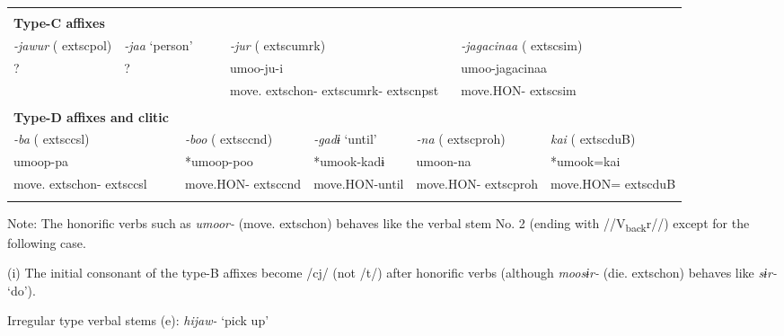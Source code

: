 \begin{tabularx}{\textwidth}{XXXXXXXXXXXXXXXXXXXX}
\multicolumn{3}{X}{} & \multicolumn{3}{X}{} & \multicolumn{5}{X}{} & \multicolumn{3}{X}{} & \multicolumn{2}{X}{} & \multicolumn{2}{X}{} & \multicolumn{2}{X}{}\\
\multicolumn{20}{X}{{\bfseries Type-C affixes}}\\
{ \textit{{}-jawur} (	extsc{pol})} & \multicolumn{4}{X}{{ \textit{{}-jaa} ‘person’}} & \multicolumn{6}{X}{{ \textit{{}-jur} (	extsc{umrk})}} & \multicolumn{9}{X}{{ \textit{{}-jagacinaa} (	extsc{sim})}}\\
{ ?} & \multicolumn{4}{X}{?} & \multicolumn{6}{X}{umoo-ju-i} & \multicolumn{9}{X}{{ umoo-jagacinaa}}\\
& \multicolumn{4}{X}{} & \multicolumn{6}{X}{move.	extsc{hon}-	extsc{umrk}-	extsc{npst}} & \multicolumn{9}{X}{move.HON-	extsc{sim}}\\
\multicolumn{20}{X}{}\\
\multicolumn{20}{X}{{\bfseries Type-D affixes and clitic}}\\
\multicolumn{4}{X}{{ \textit{{}-ba} (	extsc{csl})}} & \multicolumn{4}{X}{{ \textit{{}-boo} (	extsc{cnd})}} & \multicolumn{2}{X}{{ \textit{{}-gadɨ} ‘until’}} & \multicolumn{3}{X}{{ \textit{{}-na} (	extsc{proh})}} & \multicolumn{7}{X}{{ \textit{kai} (	extsc{du}B)}}\\
\multicolumn{4}{X}{{ umoop-pa}} & \multicolumn{4}{X}{{ *umoop-poo}} & \multicolumn{2}{X}{{ *umook-kadɨ}} & \multicolumn{3}{X}{{ umoon-na}} & \multicolumn{7}{X}{{ *umook=kai}}\\
\multicolumn{4}{X}{move.	extsc{hon}-	extsc{csl}} & \multicolumn{4}{X}{move.HON-	extsc{cnd}} & \multicolumn{2}{X}{move.HON-until} & \multicolumn{3}{X}{move.HON-	extsc{proh}} & \multicolumn{7}{X}{move.HON=	extsc{du}B}\\
\lspbottomrule
\end{tabularx}
Note: The honorific verbs such as \textit{umoor-} (move.	extsc{hon}) behaves like the verbal stem No. 2 (ending with //V\textsubscript{back}r//) except for the following case.

(i)  The initial consonant of the type-B affixes become /cj/ (not /t/) after honorific verbs (although \textit{moosɨr-} (die.	extsc{hon}) behaves like \textit{sɨr-} ‘do’).

Irregular type verbal stems (e): \textit{hijaw-} ‘pick up’

\tablefirsthead{}

